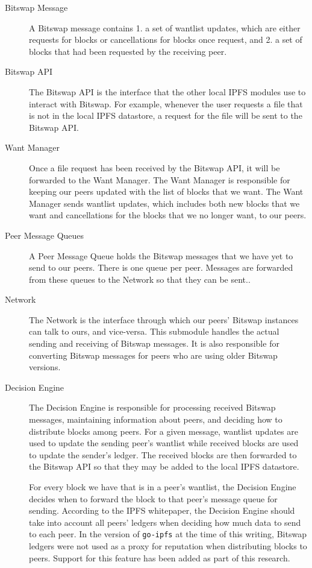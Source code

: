 \begin{description}

\item[Bitswap Message]
A Bitswap message contains 1. a set of wantlist updates, which are
either requests for blocks or cancellations for blocks once request, and
2. a set of blocks that had been requested by the receiving peer.

\item[Bitswap API]
The Bitswap API is the interface that the other local IPFS modules use
to interact with Bitswap. For example, whenever the user requests a file
that is not in the local IPFS datastore, a request for the file will be
sent to the Bitswap API.

\item[Want Manager]
Once a file request has been received by the Bitswap API, it will be
forwarded to the Want Manager. The Want Manager is responsible for
keeping our peers updated with the list of blocks that we want. The Want
Manager sends wantlist updates, which includes both new blocks that we
want and cancellations for the blocks that we no longer want, to our
peers.

\item[Peer Message Queues]
A Peer Message Queue holds the Bitswap messages that we have yet to send
to our peers. There is one queue per peer. Messages are forwarded from
these queues to the Network so that they can be sent..

\item[Network]
The Network is the interface through which our peers' Bitswap instances
can talk to ours, and vice-versa. This submodule handles the actual
sending and receiving of Bitswap messages. It is also responsible for
converting Bitswap messages for peers who are using older Bitswap
versions.

\item[Decision Engine]
The Decision Engine is responsible for processing received Bitswap
messages, maintaining information about peers, and deciding how to
distribute blocks among peers. For a given message, wantlist updates are
used to update the sending peer's wantlist while received blocks are
used to update the sender's ledger. The received blocks are then
forwarded to the Bitswap API so that they may be added to the local IPFS
datastore.

For every block we have that is in a peer's wantlist, the Decision
Engine decides when to forward the block to that peer's message queue
for sending. According to the IPFS whitepaper, the Decision Engine
should take into account all peers' ledgers when deciding how much data
to send to each peer. In the version of \texttt{go-ipfs} at the time of
this writing, Bitswap ledgers were not used as a proxy for reputation
when distributing blocks to peers. Support for this feature has been
added as part of this research.
\end{description}

